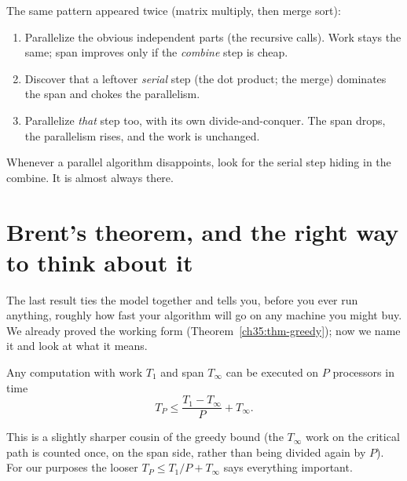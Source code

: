 \begin{focusbox}
The same pattern appeared twice (matrix multiply, then merge sort):
\begin{enumerate}
\item Parallelize the obvious independent parts (the recursive calls). Work stays
the same; span improves only if the \emph{combine} step is cheap.
\item Discover that a leftover \emph{serial} step (the dot product; the merge)
dominates the span and chokes the parallelism.
\item Parallelize \emph{that} step too, with its own divide-and-conquer. The span
drops, the parallelism rises, and the work is unchanged.
\end{enumerate}
Whenever a parallel algorithm disappoints, look for the serial step hiding in the
combine. It is almost always there.
\end{focusbox}

\section{Brent's theorem, and the right way to think about it}

The last result ties the model together and tells you, before you ever run
anything, roughly how fast your algorithm will go on any machine you might buy. We
already proved the working form (Theorem~\ref{ch35:thm-greedy}); now we name it
and look at what it means.

\begin{theorem}\label{ch35:thm-brent}
Any computation with work $T_1$ and span $T_\infty$ can be executed on $P$
processors in time
\[
T_P \le \frac{T_1 - T_\infty}{P} + T_\infty.
\]
\end{theorem}

This is a slightly sharper cousin of the greedy bound (the $T_\infty$ work on the
critical path is counted once, on the span side, rather than being divided again
by $P$). For our purposes the looser $T_P \le T_1/P + T_\infty$ says everything
important.

